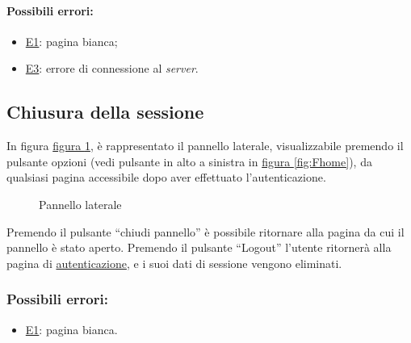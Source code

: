 \paragraph*{Possibili errori:}
\begin{itemize}
\item \hyperref[e1]{E1}: pagina bianca;
\item \hyperref[e3]{E3}: errore di connessione al \textit{server}.
\end{itemize}

\subsection{Chiusura della sessione}
\label{logout}
In figura \hyperref[fig:Flogout]{figura \ref{fig:Flogout}}, è rappresentato il pannello laterale, visualizzabile premendo il pulsante opzioni (vedi pulsante in alto a sinistra in \hyperref[fig:Fhome]{figura \ref{fig:Fhome}}), da qualsiasi pagina accessibile dopo aver effettuato l'autenticazione.

\begin{figure}[H] \centering 
{} \caption{Pannello laterale}
\label{fig:Flogout}
\end{figure}

Premendo il pulsante ``chiudi pannello'' è possibile ritornare alla pagina da cui il pannello è stato aperto.
Premendo il pulsante ``Logout'' l'utente ritornerà alla pagina di \hyperref[autenticazione]{autenticazione}, e i suoi dati di sessione vengono eliminati.

\subsubsection*{Possibili errori:}
\begin{itemize}
\item \hyperref[e1]{E1}: pagina bianca.
\end{itemize}